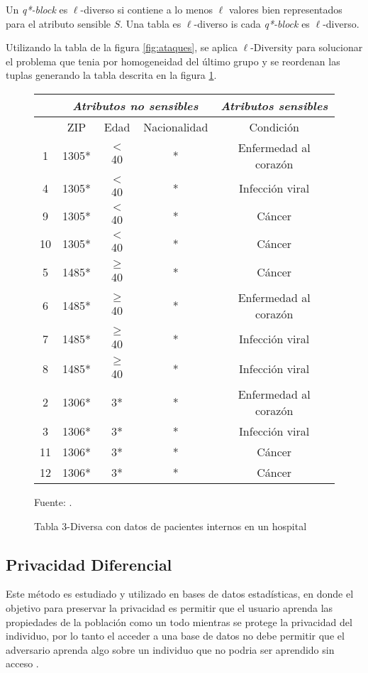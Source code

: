 \begin{definicion}
  Un \textit{q*-block} es $\ell$-diverso si contiene a lo menos $\ell$ valores bien representados para el atributo sensible $S$. Una tabla es $\ell$-diverso is cada \textit{q*-block} es $\ell$-diverso.
\end{definicion}

Utilizando la tabla de la figura \ref{fig:ataques}, se aplica $\ell$-Diversity para solucionar el problema que tenia por homogeneidad del último grupo y se reordenan las tuplas generando la tabla descrita en la figura \ref{fig:l-divesity_ejemplo}.

\begin{figure}[H]
    \centering
    \begin{tabular}{|c||c|c|c|c|}
        \hline
        & \multicolumn{3}{|c|}{\textit{Atributos no sensibles}} & \textit{Atributos sensibles} \\
        \hline
        & ZIP & Edad & Nacionalidad & Condición \\
        \hline
        1 & 1305* & $<$ 40 & * & Enfermedad al corazón \\
        4 & 1305* & $<$ 40 & * & Infección viral \\
        9 & 1305* & $<$ 40 & * & Cáncer \\
        10 & 1305* & $<$ 40 & * & Cáncer \\
        \hline
        5 & 1485* & $\geq$ 40 & * & Cáncer \\
        6 & 1485* & $\geq$ 40 & * & Enfermedad al corazón \\
        7 & 1485* & $\geq$ 40 & * & Infección viral \\
        8 & 1485* & $\geq$ 40 & * & Infección viral \\
        \hline
        2 & 1306* & 3* & * & Enfermedad al corazón \\
        3 & 1306* & 3* & * & Infección viral \\
        11 & 1306* & 3* & * & Cáncer \\
        12 & 1306* & 3* & * & Cáncer \\
        \hline
    \end{tabular}
    \caption{\label{fig:l-divesity_ejemplo}Tabla 3-Diversa con datos de pacientes internos en un hospital} Fuente: \cite{machanavajjhala2006ell}.
\end{figure}

\subsection{Privacidad Diferencial}
Este método es estudiado y utilizado en bases de datos estadísticas, en donde el objetivo para preservar la privacidad es permitir que el usuario aprenda las propiedades de la población como un todo mientras se protege la privacidad del individuo, por lo tanto el acceder a una base de datos no debe permitir que el adversario aprenda algo sobre un individuo que no podria ser aprendido sin acceso \cite{dwork2011differential}.

